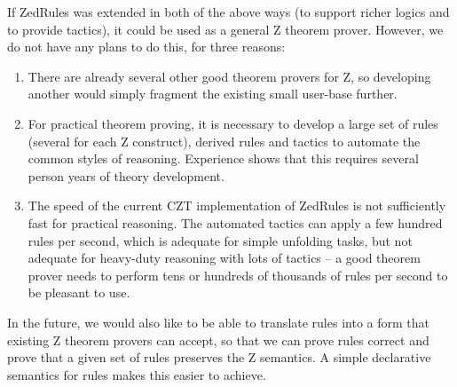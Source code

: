\documentclass{entcs}
\begin{document}
If ZedRules was extended in both of the above ways (to support richer
logics and to provide tactics), it could be used as a general Z theorem
prover.  However, we do not have any plans to do this, for three reasons:
\begin{enumerate}
\item There are already several other good theorem provers for Z, so
  developing another would simply fragment the existing small user-base
  further.
\item For practical theorem proving, it is necessary to develop a large set
  of rules (several for each Z construct), derived rules and tactics to
  automate the common styles of reasoning.  Experience shows that this
  requires several person years of theory development. 
\item The speed of the current CZT implementation of ZedRules is not
  sufficiently fast for practical reasoning.  The automated tactics can
  apply a few hundred rules per second, which is adequate for simple unfolding
  tasks, but not adequate for heavy-duty reasoning with lots of tactics --
  a good theorem prover needs to perform tens or hundreds of thousands of
  rules per second to be pleasant to use.
\end{enumerate}

In the future, we would also like to be able to translate rules
into a form that existing Z theorem provers can accept, so that we can prove
rules correct and prove that a given set of rules preserves the Z
semantics.  A simple declarative semantics for rules makes this
easier to achieve.



\end{document}
